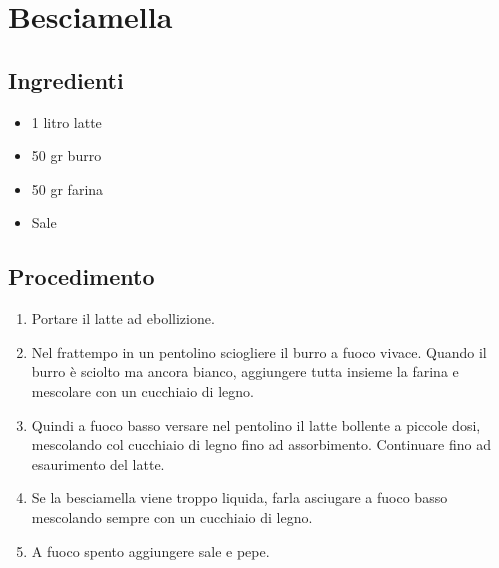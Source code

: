 \section{Besciamella}
\subsection{Ingredienti}
\begin{itemize}
\item 1 litro latte  
\item 50 gr burro  
\item 50 gr farina  
\item Sale
\end{itemize}
\subsection{Procedimento}
\begin{enumerate}
\item  Portare il latte ad ebollizione.  
\item  Nel frattempo in un pentolino sciogliere il burro a fuoco vivace. Quando il burro è sciolto ma ancora bianco, aggiungere tutta insieme la farina e mescolare con un cucchiaio di legno.  
\item  Quindi a fuoco basso versare nel pentolino il latte bollente a piccole dosi, mescolando col cucchiaio di legno fino ad assorbimento. Continuare fino ad esaurimento del latte.   
\item  Se la besciamella viene troppo liquida, farla asciugare a fuoco basso mescolando sempre con un cucchiaio di legno.  
\item  A fuoco spento aggiungere sale e pepe.
\end{enumerate}
